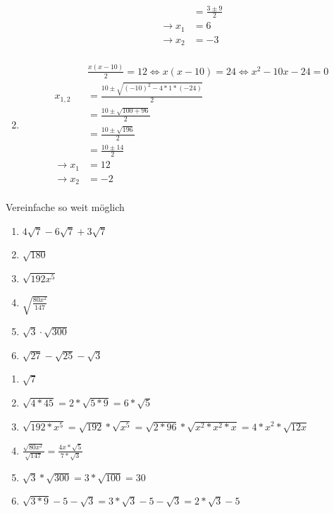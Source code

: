 \begin{lsg}{}
\begin{enumerate}
\begin{align*}
        &=\frac{3\pm9}{2}\\
        \rightarrow x_1&=6\\
        \rightarrow x_2&=-3\\
      \end{align*}
      \item
      \begin{align*}
        &\frac{x(x-10)}{2} = 12 \Leftrightarrow x(x-10)=24 \Leftrightarrow x^2 - 10x - 24 = 0\\
        x_{1,2}&=\frac{10\pm\sqrt{(-10)^2-4*1*(-24)}}{2}\\
        &=\frac{10\pm\sqrt{100+96}}{2}\\
        &=\frac{10\pm\sqrt{196}}{2}\\
        &=\frac{10\pm14}{2}\\
        \rightarrow x_1&=12\\
        \rightarrow x_2&=-2\\
      \end{align*}
    \end{enumerate}
\end{lsg}


 Vereinfache so weit möglich
\begin{multicols}{3}
  \begin{enumerate}
    \item $4\sqrt{7}-6\sqrt{7} + 3\sqrt{7}$
    \item $\sqrt{180}$
    \item $\sqrt{192x^5}$
    \item $\sqrt{\frac{80x^2}{147}}$
    \item $\sqrt{3}\cdot\sqrt{300}$
    \item $\sqrt{27}-\sqrt{25}-\sqrt{3}$
  \end{enumerate}
\end{multicols}

\begin{lsg}{}
  \begin{multicols}{3}
    \begin{enumerate}
      \item $\sqrt{7}$
      \item $\sqrt{4*45}=2*\sqrt{5*9}=6*\sqrt 5$
      \item $\sqrt{192*x^5}=\sqrt{192}*\sqrt{x^5}=\sqrt{2*96}*\sqrt{x^2*x^2*x}=4*x^2*\sqrt{12x}$
      \item $\frac{\sqrt{80x^2}}{\sqrt{147}} = \frac{4x*\sqrt{5}}{7*\sqrt{3}}$
      \item $\sqrt{3}*\sqrt{300}=3*\sqrt{100}=30$
      \item $\sqrt{3*9}-5-\sqrt{3}=3*\sqrt{3}-5-\sqrt{3}=2*\sqrt{3}-5$
    \end{enumerate}
  \end{multicols}
\end{lsg}


